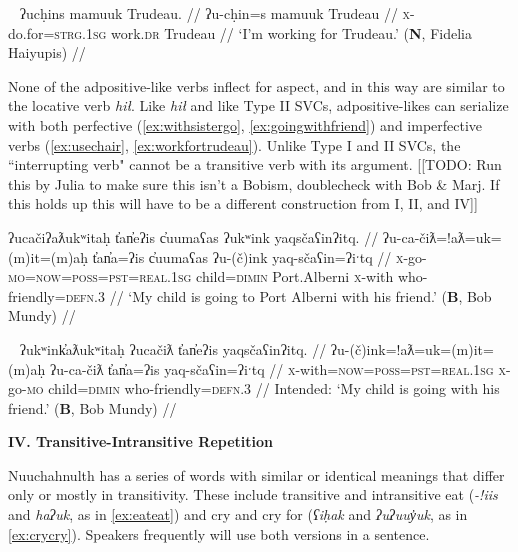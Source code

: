 \ex~ \label{ex:workfortrudeau}
\begingl
\glpreamble ʔucḥins mamuuk Trudeau. //
\gla ʔu-cḥin=s mamuuk Trudeau //
\glb \textsc{x}-do.for=\textsc{strg.1sg} work.\textsc{dr} Trudeau //
\glft `I'm working for Trudeau.' (\textbf{N}, Fidelia Haiyupis) //
\endgl
\xe

None of the adpositive-like verbs inflect for aspect, and in this way are similar to the locative verb \textit{hił}. Like \textit{hił} and like Type II SVCs, adpositive-likes can serialize with both perfective (\ref{ex:withsistergo}, \ref{ex:goingwithfriend}) and imperfective verbs (\ref{ex:usechair}, \ref{ex:workfortrudeau}). Unlike Type I and II SVCs, the ``interrupting verb" cannot be a transitive verb with its argument. [[TODO: Run this by Julia to make sure this isn't a Bobism, doublecheck with Bob \& Marj. If this holds up this will have to be a different construction from I, II, and IV]]

\ex \label{ex:goingwithfriend}
\begingl
\glpreamble ʔucačiʔaƛukʷitaḥ t̓an̓eʔis c̓uumaʕas ʔukʷink yaqsčaʕinʔitq. //
\gla ʔu-ca-čiƛ=!aƛ=uk=(m)it=(m)aḥ t̓an̓a=ʔis c̓uumaʕas ʔu-(č)ink yaq-sčaʕin=ʔiˑtq //
\glb \textsc{x}-go-\textsc{mo}=\textsc{now}=\textsc{poss}=\textsc{pst}=\textsc{real.1sg} child=\textsc{dimin} Port.Alberni \textsc{x}-with who-friendly=\textsc{defn.3} //
\glft `My child is going to Port Alberni with his friend.' (\textbf{B}, Bob Mundy) //
\endgl
\xe

\ex~ \label{ex:*goingwithfriend}
\begingl
\glpreamble *ʔukʷink̓aƛukʷitaḥ ʔucačiƛ t̓an̓eʔis yaqsčaʕinʔitq. //
\gla ʔu-(č)ink=!aƛ=uk=(m)it=(m)aḥ ʔu-ca-čiƛ t̓an̓a=ʔis yaq-sčaʕin=ʔiˑtq //
\glb \textsc{x}-with=\textsc{now}=\textsc{poss}=\textsc{pst}=\textsc{real.1sg} \textsc{x}-go-\textsc{mo} child=\textsc{dimin} who-friendly=\textsc{defn.3} //
\glft Intended: `My child is going with his friend.' (\textbf{B}, Bob Mundy) //
\endgl
\xe

\vspace{10pt}

\noindent \textbf{IV. Transitive-Intransitive Repetition}

\vspace{10pt}

Nuuchahnulth has a series of words with similar or identical meanings that differ only or mostly in transitivity. These include transitive and intransitive eat (\textit{-!iis} and \textit{haʔuk}, as in \ref{ex:eateat}) and cry and cry for (\textit{ʕiḥak} and \textit{ʔuʔuuy̓uk}, as in \ref{ex:crycry}). Speakers frequently will use both versions in a sentence.

